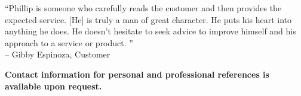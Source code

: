 \documentclass[margin]{res}
\newcommand{\sectionspace}{\vspace{10pt}}
\begin{document}
\begin{resume}
              
                ``Phillip is someone who carefully reads the customer and then provides the
expected service. [He] is truly a man of great character. He puts his
heart into anything he does. He doesn't hesitate to seek advice to improve
himself and his approach to a service or product.
''                    \\
                -- Gibby Espinoza, Customer
              

\sectionspace


\sectionspace


\textbf{\footnotesize Contact information for personal and professional references is available upon request.}


\end{resume}
\end{document}
